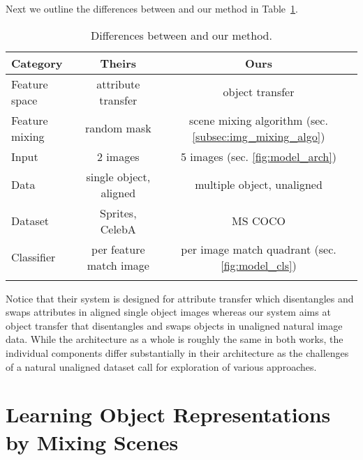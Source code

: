 \documentclass[12pt,a4paper]{article}
\begin{document}
Next we outline the differences between \cite{DisentFacOfVarByMixTh} and our method in Table~\ref{tab:diffHuVsLorbms}.
\begin{table} [H]
\centering
\begin{tabular}{l|c|c}
\Xhline{0.8pt}
\textbf{Category} & \textbf{Theirs} & \textbf{Ours}\\
\hline
Feature space & attribute transfer & object transfer\\
\hline
Feature mixing & random mask & scene mixing algorithm (sec. \ref{subsec:img_mixing_algo}) \\
\hline
Input  & 2 images & 5 images (sec. \ref{fig:model_arch}) \\
\hline
Data & single object, aligned & multiple object, unaligned\\
\hline
Dataset & Sprites, CelebA & MS COCO \\
\hline
Classifier & per feature match image & per image match quadrant (sec. \ref{fig:model_cls}) \\
\Xhline{0.8pt}
\end{tabular}
\caption{Differences between \cite{DisentFacOfVarByMixTh} and our method.} \label{tab:diffHuVsLorbms}
\end{table}
Notice that their system is designed for attribute transfer which disentangles and swaps attributes in aligned single object images whereas our system aims at object transfer that disentangles and swaps objects in unaligned natural image data. While the architecture as a whole is roughly the same in both works, the individual components differ substantially in their architecture as the challenges of a natural unaligned dataset call for exploration of various approaches.
 

%
\newpage
\section{Learning Object Representations by Mixing Scenes}\label{sec:lorbms_method}
\end{document}
